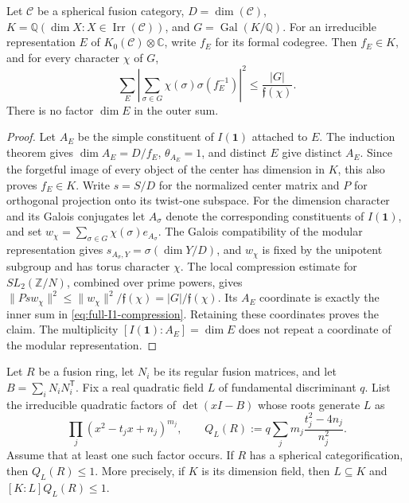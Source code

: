 
\begin{proposition}
Let $\mathcal C$ be a spherical fusion category, $D=\dim(\mathcal C)$,
$K=\mathbb Q(\dim X:X\in\operatorname{Irr}(\mathcal C))$, and
$G=\operatorname{Gal}(K/\mathbb Q)$.  For an irreducible representation
$E$ of $K_0(\mathcal C)\otimes\mathbb C$, write $f_E$ for its formal
codegree.  Then $f_E\in K$, and for every character $\chi$ of $G$,
\begin{equation}\label{eq:full-I1-compression}
 \sum_E\left|\sum_{\sigma\in G}
       \chi(\sigma)\sigma(f_E^{-1})\right|^2
       \leq \frac{|G|}{\mathfrak f(\chi)}.
\end{equation}
There is no factor $\dim E$ in the outer sum.
\end{proposition}

\begin{proof}
Let $A_E$ be the simple constituent of $I(\mathbf1)$ attached to $E$.
The induction theorem gives
$\dim A_E=D/f_E$, $\theta_{A_E}=1$, and distinct $E$ give distinct
$A_E$.  Since the forgetful image of every object of the center has
dimension in $K$, this also proves $f_E\in K$.
Write $s=S/D$ for the normalized center matrix and $P$ for orthogonal
projection onto its twist-one subspace.  For the dimension character and
its Galois conjugates let $A_\sigma$ denote the corresponding constituents
of $I(\mathbf1)$, and set
$w_\chi=\sum_{\sigma\in G}\chi(\sigma)e_{A_\sigma}$.
The Galois compatibility of the modular representation gives
$s_{A_\sigma,Y}=\sigma(\dim Y/D)$, and $w_\chi$ is fixed by the
unipotent subgroup and has torus character $\chi$.  The local compression
estimate for $SL_2(\mathbb Z/N)$, combined over prime powers, gives
$\|Ps w_\chi\|^2\leq\|w_\chi\|^2/\mathfrak f(\chi)
=|G|/\mathfrak f(\chi)$.
Its $A_E$ coordinate is exactly the inner sum in
\eqref{eq:full-I1-compression}.  Retaining these coordinates proves the
claim.  The multiplicity $[I(\mathbf1):A_E]=\dim E$ does not repeat a
coordinate of the modular representation.
\end{proof}

\begin{corollary}\label{cor:quadratic-Casimir}
Let $R$ be a fusion ring, let $N_i$ be its regular fusion matrices, and let
$B=\sum_iN_iN_i^{\mathsf T}$.  Fix a real quadratic field $L$ of
fundamental discriminant $q$.  List the irreducible quadratic factors of
$\det(xI-B)$ whose roots generate $L$ as
\[
 \prod_j(x^2-t_jx+n_j)^{m_j},
 \qquad
 Q_L(R):=q\sum_jm_j\frac{t_j^2-4n_j}{n_j^2}.
\]
Assume that at least one such factor occurs.  If $R$ has a spherical categorification, then
$Q_L(R)\leq1$.  More precisely, if $K$ is its dimension field, then
$L\subseteq K$ and $[K:L]Q_L(R)\leq1$.
\end{corollary}

